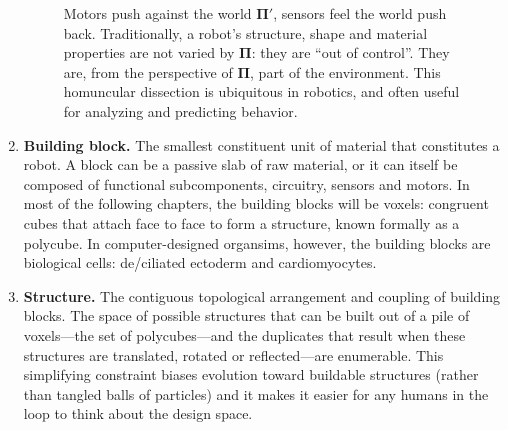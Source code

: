 \begin{enumerate}
\begin{figure}[H]
\begin{minipage}[t]{0.47\linewidth}
{        Motors push against the world $\mathbf{\Pi'}$, sensors feel the world push back.
        Traditionally, a robot's structure, shape and material properties are not varied by $\mathbf{\Pi}$: they are ``out of control''.
        They are, from the perspective of $\mathbf{\Pi}$, part of the environment.
        This homuncular dissection is ubiquitous in robotics, and often useful for analyzing and predicting behavior.
        }
    \end{minipage}
    \end{figure}
    
    \item \textbf{Building block.} 
    The smallest constituent unit of material that constitutes a robot.
    A block can be a passive slab of raw material,
    or it can itself be composed
    of functional subcomponents, circuitry, sensors and motors.
    In most of the following chapters,
    the building blocks will be voxels: congruent cubes that attach face to face to form a structure, known formally as a polycube.
    In computer-designed organsims, however, the building blocks are biological cells: de/ciliated ectoderm and cardiomyocytes.
    
    
    \item \textbf{Structure.} The contiguous topological arrangement and coupling of building blocks.
    The space of possible structures that can be built out of a pile of voxels---the set of polycubes---and the duplicates that result when these structures are translated, rotated or reflected---are enumerable.
    This simplifying constraint biases evolution toward buildable structures (rather than tangled balls of particles) and it makes it easier for any humans in the loop to think about the design space.
    

\end{enumerate}
